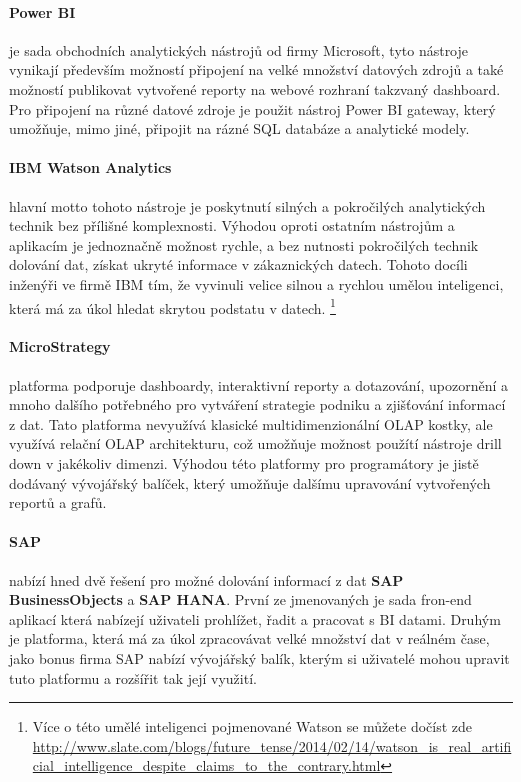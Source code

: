 \paragraph{Power BI} je sada obchodních analytických nástrojů od firmy Microsoft, tyto nástroje vynikají především možností připojení na velké množství datových zdrojů a také možností publikovat vytvořené reporty na webové rozhraní takzvaný dashboard. Pro připojení na různé datové zdroje je použit nástroj Power BI gateway, který umožňuje, mimo jiné, připojit na rázné SQL databáze a analytické modely. \cite{powerbi}

\paragraph{IBM Watson Analytics} hlavní motto tohoto nástroje je poskytnutí silných a pokročilých analytických technik bez přílišné komplexnosti. Výhodou oproti ostatním nástrojům a aplikacím je jednoznačně možnost rychle, a bez nutnosti pokročilých technik dolování dat, získat ukryté informace v zákaznických datech. Tohoto docíli inženýři ve firmě IBM tím, že vyvinuli velice silnou a rychlou umělou inteligenci, která má za úkol hledat skrytou podstatu v datech. \footnote{Více o této umělé inteligenci pojmenované Watson se můžete dočíst zde \url{http://www.slate.com/blogs/future_tense/2014/02/14/watson_is_real_artificial_intelligence_despite_claims_to_the_contrary.html}} \cite{watson}

\paragraph{MicroStrategy} platforma podporuje dashboardy, interaktivní reporty a dotazování, upozornění a mnoho dalšího potřebného pro vytváření strategie podniku a zjišťování informací z dat. Tato platforma nevyužívá klasické multidimenzionální OLAP kostky, ale využívá relační OLAP architekturu, což umožňuje možnost použítí nástroje drill down v jakékoliv dimenzi. Výhodou této platformy pro programátory je jistě dodávaný vývojářský balíček, který umožňuje dalšímu upravování vytvořených reportů a grafů. \cite{microstrategy}

\paragraph{SAP} nabízí hned dvě řešení pro možné dolování informací z dat \textbf{SAP BusinessObjects} a \textbf{SAP HANA}. První ze jmenovaných je sada fron-end aplikací která nabízejí uživateli prohlížet, řadit a pracovat s BI datami. Druhým je platforma, která má za úkol zpracovávat velké množství dat v reálném čase, jako bonus firma SAP nabízí vývojářský balík, kterým si uživatelé mohou upravit tuto platformu a rozšířit tak její využití. \cite{sap}

